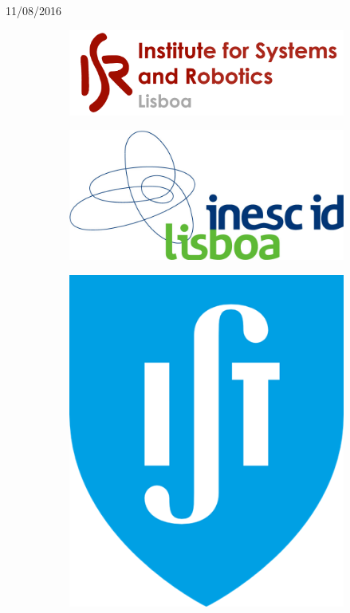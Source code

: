 \begin{titlepage}


{\large 11/08/2016}\\[1cm] %




\begin{figure}
\centering
\begin{subfigure}{.5\textwidth}
  \centering
  \includegraphics[width=.5\linewidth]{isr-logo.png}
\end{subfigure}%
\begin{subfigure}{.5\textwidth}
  \centering
  \includegraphics[width=.5\linewidth]{inesc-id-logo.png}
\end{subfigure}
\begin{subfigure}{.5\textwidth}
  \centering
  \includegraphics[width=.25\linewidth]{ist-logo.png}
\end{subfigure}
\end{figure}
 

\end{titlepage}
